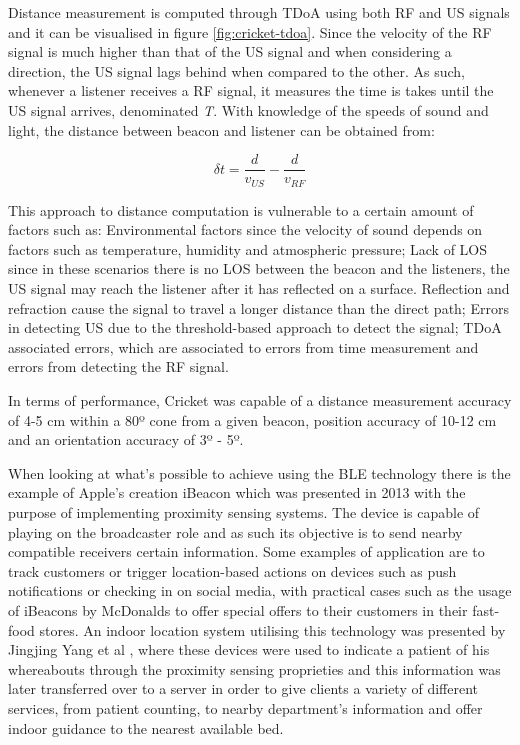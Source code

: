 Distance measurement is computed through \ac{TDoA} using both \ac{RF} and \ac{US} signals and it can be visualised in figure \ref{fig:cricket-tdoa}. Since the velocity of the \ac{RF} signal is much higher than that of the \ac{US} signal and when considering a direction, the \ac{US} signal lags behind when compared to the other. As such, whenever a listener receives a \ac{RF} signal, it measures the time is takes until the \ac{US} signal arrives, denominated \textit{\delta T}. With knowledge of the speeds of sound and light, the distance between beacon and listener can be obtained from:

$$ \delta t = \frac{d}{v_{US}} - \frac{d}{v_{RF}}  $$

This approach to distance computation is vulnerable to a certain amount of factors such as: Environmental factors since the velocity of sound depends on factors such as temperature, humidity and atmospheric pressure; Lack of \ac{LOS} since in these scenarios there is no \ac{LOS} between the beacon and the listeners, the \ac{US} signal may reach the listener after it has reflected on a surface. Reflection and refraction cause the signal to travel a longer distance than the direct path; Errors in detecting \ac{US} due to the threshold-based approach to detect the signal; \ac{TDoA} associated errors, which are associated to errors from time measurement and errors from detecting the \ac{RF} signal.

In terms of performance, Cricket was capable of a distance measurement accuracy of 4-5 cm within a 80º cone from a given beacon, position accuracy of 10-12 cm and an orientation accuracy of 3º - 5º.



\label{subsec:ble}
	
When looking at what's possible to achieve using the BLE technology there is the example of Apple's creation iBeacon \cite{ibeacon} which was presented in 2013 with the purpose of implementing proximity sensing systems. The device is capable of playing on the broadcaster role and as such its objective is to send nearby compatible receivers certain information. Some examples of application are to track customers or trigger location-based actions on devices such as push notifications or checking in on social media, with practical cases such as the usage of iBeacons by McDonalds to offer special offers to their customers in their fast-food stores. An indoor location system utilising this technology was presented by Jingjing Yang et al \cite{ibeacon1}, where these devices were used to indicate a patient of his whereabouts through the proximity sensing proprieties and this information was later transferred over to a server in order to give clients a variety of different services, from patient counting, to nearby department's information and offer indoor guidance to the nearest available bed. 

